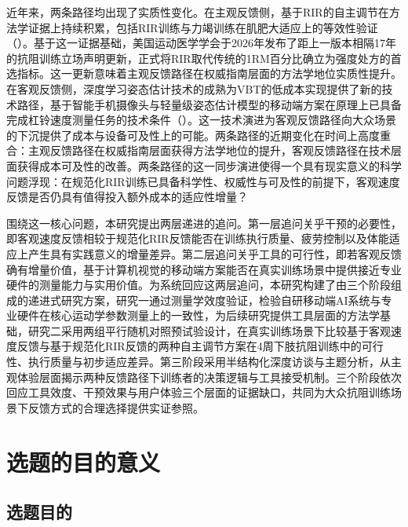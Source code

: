 近年来，两条路径均出现了实质性变化。在主观反馈侧，基于RIR的自主调节在方法学证据上持续积累，包括RIR训练与力竭训练在肌肥大适应上的等效性验证（\citep{Refalo2024}）。基于这一证据基础，美国运动医学学会于2026年发布了距上一版本相隔17年的抗阻训练立场声明更新，正式将RIR取代传统的1RM百分比确立为强度处方的首选指标\citep{Currier2026}。这一更新意味着主观反馈路径在权威指南层面的方法学地位实质性提升。在客观反馈侧，深度学习姿态估计技术的成熟为VBT的低成本实现提供了新的技术路径，基于智能手机摄像头与轻量级姿态估计模型的移动端方案在原理上已具备完成杠铃速度测量任务的技术条件（\citep{Bazarevsky2020}）。这一技术演进为客观反馈路径向大众场景的下沉提供了成本与设备可及性上的可能。两条路径的近期变化在时间上高度重合：主观反馈路径在权威指南层面获得方法学地位的提升，客观反馈路径在技术层面获得成本可及性的改善。两条路径的这一同步演进使得一个具有现实意义的科学问题浮现：在规范化RIR训练已具备科学性、权威性与可及性的前提下，客观速度反馈是否仍具有值得投入额外成本的适应性增量？

围绕这一核心问题，本研究提出两层递进的追问。第一层追问关乎干预的必要性，即客观速度反馈相较于规范化RIR反馈能否在训练执行质量、疲劳控制以及体能适应上产生具有实践意义的增量差异。第二层追问关乎工具的可行性，即若客观反馈确有增量价值，基于计算机视觉的移动端方案能否在真实训练场景中提供接近专业硬件的测量能力与实用价值。为系统回应这两层追问，本研究构建了由三个阶段组成的递进式研究方案，研究一通过测量学效度验证，检验自研移动端AI系统与专业硬件在核心运动学参数测量上的一致性，为后续研究提供工具层面的方法学基础，研究二采用两组平行随机对照预试验设计，在真实训练场景下比较基于客观速度反馈与基于规范化RIR反馈的两种自主调节方案在4周下肢抗阻训练中的可行性、执行质量与初步适应差异。第三阶段采用半结构化深度访谈与主题分析，从主观体验层面揭示两种反馈路径下训练者的决策逻辑与工具接受机制。三个阶段依次回应工具效度、干预效果与用户体验三个层面的证据缺口，共同为大众抗阻训练场景下反馈方式的合理选择提供实证参照。

\section{选题的目的意义}

\subsection{选题目的}

